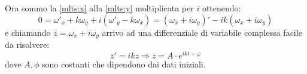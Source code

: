 \documentclass[../main.tex]{subfiles}
\begin{document}
Ora sommo la \cref{mlts:x} alla \cref{mlts:y} moltiplicata per $i$ ottenendo:
\begin{equation*}
	0=\omega'_x+k\omega_y+i(\omega'_y-k\omega_x)=(\omega_x+i\omega_y)'-ik(\omega_x+i\omega_y)
\end{equation*}
e chiamando $z=\omega_x+i\omega_y$ arrivo ad una differenziale di variabile complessa facile da risolvere:
\begin{equation}\label{mlts:complessa}
	z'=ikz \Rightarrow z=A\cdot e^{ikt+\varphi}
\end{equation}
dove $A,\phi$ sono costanti che dipendono dai dati iniziali.
\end{document}
